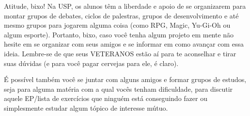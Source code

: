 \begin{secao}{Atitude, bixo!}
Na USP, os alunos têm a liberdade e apoio de se organizarem
para montar grupos de debates, ciclos de palestras, grupos
de desenvolvimento e até mesmo grupos para jogarem alguma coisa (como
RPG, Magic, Yu-Gi-Oh ou algum esporte). 
Portanto, bixo, caso você tenha algum projeto em mente não hesite
em se organizar com seus amigos e se informar em como avançar com essa ideia. 
Lembre-se de que seus VETERANOS estão aí para te aconselhar e tirar suas
dúvidas (e para você pagar cervejas para ele, é claro).

É possível também você se juntar com alguns amigos e formar grupos de
estudos, seja para alguma matéria com a qual vocês tenham dificuldade, para
discutir aquele EP/lista de exercícios que ninguém está conseguindo
fazer ou simplesmente estudar algum tópico de interesse mútuo.
\end{secao}
